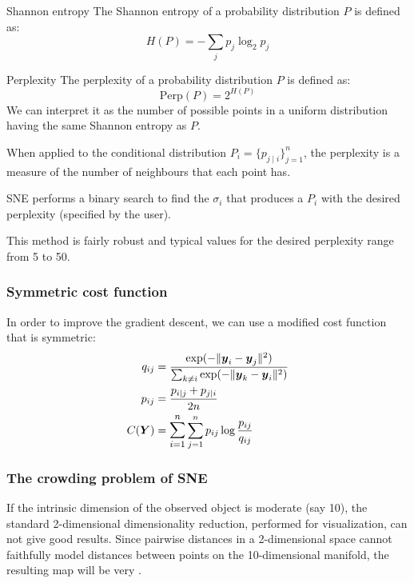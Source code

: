 \begin{definition}{Shannon entropy}{}
	The Shannon entropy of a probability distribution $P$ is defined as:
	\begin{equation*}
		H(P) = - \sum_{j} p_j \log_2 p_j
	\end{equation*}
\end{definition}

\begin{definition}{Perplexity}{}
	The perplexity of a probability distribution $P$ is defined as:
	\begin{equation*}
		\text{Perp}(P) = 2^{H(P)}
	\end{equation*}
	\tcblower
	We can interpret it as the number of possible points in a uniform
	distribution having the same Shannon entropy as $P$.
	\tcbline
	\begin{note}
		When applied to the conditional distribution $P_i = \{p_{j\mid i}\}^n_{j=1}$,
		the perplexity is a measure of the number of neighbours that each point has.
	\end{note}

\end{definition}

\begin{marker}
	SNE performs a binary search to find the $\sigma_i$ that produces a
	$P_i$ with the desired perplexity (specified by the user).
\end{marker}

This method is fairly robust and typical values for the desired perplexity
range from 5 to 50.

\subsubsection{Symmetric cost function}
In order to improve the gradient descent, we can use a modified cost function
that is symmetric:
\begin{align*}
	q_{ij}           & = \frac{\exp(-\lVert \boldsymbol y_i - \boldsymbol y_j \rVert^2)}{\sum_{k \neq i} \exp(-\lVert \boldsymbol y_k - \boldsymbol y_i \rVert^2)} \\
	p_{ij}           & = \frac{p_{i \mid j} + p_{j \mid i}}{2n}                                                                                                    \\
	C(\boldsymbol Y) & =
	\mathlarger{\sum_{i=1}^n} \sum_{j=1}^n p_{ij} \log \frac{p_{ij}}{q_{ij}}
\end{align*}

\subsubsection{The crowding problem of SNE}
If the intrinsic dimension of the observed object is moderate (say 10),
the standard 2-dimensional dimensionality reduction, performed for
visualization, can not give good results. Since pairwise distances
in a 2-dimensional space cannot faithfully model distances between points
on the 10-dimensional manifold, the resulting map will be very .

